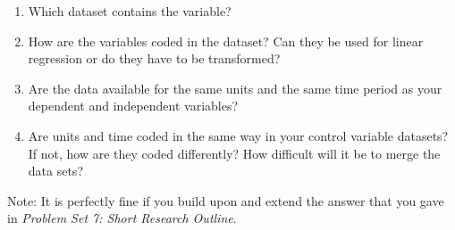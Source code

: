 \documentclass[12pt]{article}
\begin{document}
\begin{enumerate}
	\item Which dataset contains the variable?
	\item How are the variables coded in the dataset? Can they be used for linear regression or do they have to be transformed?
	\item Are the data available for the same units and the same time period as your dependent and independent variables?
	\item Are units and time coded in the same way in your control variable datasets? If not, how are they coded differently? How difficult will it be to merge the data sets?
\end{enumerate}

Note: It is perfectly fine if you build upon and extend the answer that you gave in \textit{Problem Set 7: Short Research Outline}.
\end{document}
